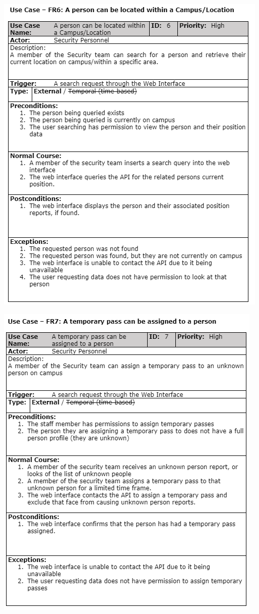 \documentclass[
  english,
  a4paper,
,tablecaptionabove
]{scrartcl}
\begin{document}
\includegraphics{images/ppm-images/use-case-6.png} \newpage

\includegraphics{images/ppm-images/use-case-7.png} \newpage
\end{document}
